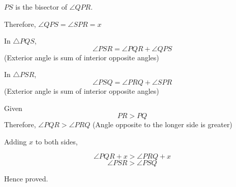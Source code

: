 $PS$ is the bisector of $\angle{QPR}$.

Therefore, $\angle{QPS} = \angle{SPR} = x$

In $\triangle{PQS}$, $$\angle{PSR}=\angle{PQR}+\angle{QPS}$$ (Exterior angle is sum of interior opposite angles)

In $\triangle{PSR}$, $$\angle{PSQ}=\angle{PRQ}+\angle{SPR}$$ (Exterior angle is sum of interior opposite angles)

Given $$PR > PQ$$
Therefore, $ \angle{PQR} > \angle{PRQ} $ (Angle opposite to the longer side is greater)

Adding $x$ to both sides,

$$\angle{PQR}+x > \angle{PRQ}+x$$
$$\angle{PSR} > \angle{PSQ}$$

Hence proved.